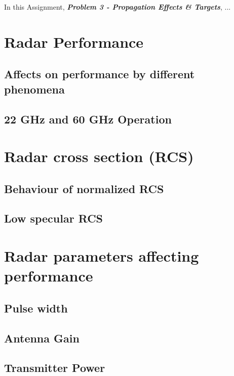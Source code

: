 

In this Assignment, \textit{\textbf{Problem 3 - Propagation Effects \& Targets}}, ...


\section{Radar Performance}

\subsection{Affects on performance by different phenomena}

\subsection{22 GHz and 60 GHz Operation}



\section{Radar cross section (RCS)}

\subsection{Behaviour of normalized RCS}

\subsection{Low specular RCS}


\section{Radar parameters affecting performance}

\subsection{Pulse width}

\subsection{Antenna Gain}

\subsection{Transmitter Power}

